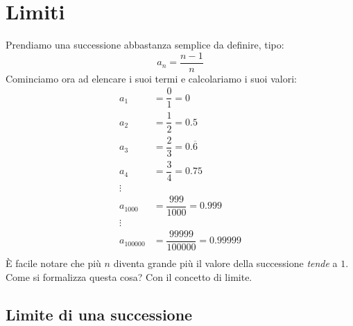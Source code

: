 \section{Limiti} \label{sec_limiti}
Prendiamo una successione abbastanza semplice da definire, tipo:
\begin{equation*}
    a_n = \frac{n-1}{n}
\end{equation*}
Cominciamo ora ad elencare i suoi termi e calcolariamo i suoi valori:
\begin{align*}
    a_1 &= \dfrac{0}{1} = 0\\
    a_2 &= \dfrac{1}{2} = 0.5\\
    a_3 &= \dfrac{2}{3} = 0.\overline{6}\\
    a_4 &= \dfrac{3}{4} = 0.75\\
    \vdots\\
    a_{1000} &= \dfrac{999}{1000} = 0.999\\
    \vdots\\
    a_{100000} &= \dfrac{99999}{100000} = 0.99999\\
\end{align*}
È facile notare che più $n$ diventa grande più il valore della successione \textit{tende} a $1$. Come si formalizza questa cosa? Con il concetto di limite.

\subsection{Limite di una successione} \label{sec_lim_successioni}

